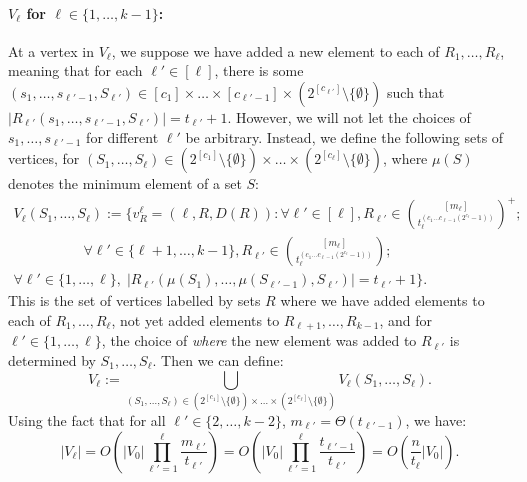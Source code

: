 \documentclass{theoretics}
\renewcommand{\>}{\rangle}
\newcommand{\<}{\langle}
\renewcommand{\(}{\left(}
\renewcommand{\)}{\right)}
\def\abs#1{\left| #1 \right|}
\begin{document}
\paragraph{$V_{\ell}$ for $\ell\in\{1,\dots,k-1\}$:} At a vertex in $V_{\ell}$, we suppose we have added a new element to each of $R_1,\dots,R_{\ell}$, meaning that for each $\ell'\in[\ell]$, there is some $(s_1,\dots,s_{\ell'-1},S_{\ell'})\in [c_1]\times\dots\times [c_{\ell'-1}]\times (2^{[c_{\ell'}]}\setminus\{\emptyset\})$ such that $|R_{\ell'}(s_1,\dots,s_{\ell'-1},S_{\ell'})|=t_{\ell'}+1$. However, we will not let the choices of $s_1,\dots,s_{\ell'-1}$ for different $\ell'$ be arbitrary. Instead, we define the following sets of vertices, for $(S_1,\dots,S_{\ell})\in (2^{[c_1]}\setminus\{\emptyset\})\times\dots\times(2^{[c_\ell]}\setminus\{\emptyset\})$, where $\mu(S)$ denotes the minimum element of a set $S$:
\begin{multline}
\!\!V_{\ell}(S_1,\dots,S_{\ell}) := \Big\{ v^{\ell}_{R}=(\ell,R,D(R)):
\forall \ell'\in [\ell], R_{\ell'}\in\binom{[m_{\ell}]}{t_\ell^{(c_1\dots c_{\ell-1}(2^{c_{\ell}}-1))}}^+\!;\\
\qquad\qquad\quad\forall \ell'\in\{\ell+1,\dots,k-1\}, R_{\ell'}\in\binom{[m_{\ell}]}{t_\ell^{(c_1\dots c_{\ell-1}(2^{c_{\ell}}-1))}};\\
\forall \ell'\in\{1,\dots,\ell\},\; |R_{\ell'}(\mu(S_1),\dots,\mu(S_{\ell'-1}),S_{\ell'})|=t_{\ell'}+1
\Big\}.\label{eq:V-ell-Ss}
\end{multline}
This is the set of vertices labelled by sets $R$ where we have added elements to each of $R_1,\dots,R_{\ell}$, not yet added elements to $R_{\ell+1},\dots,R_{k-1}$, and for $\ell'\in\{1,\dots,\ell\}$, the choice of \emph{where} the new element was added to $R_{\ell'}$ is determined by $S_1,\dots,S_{\ell}$. 
Then we can define:
\begin{equation}
V_{\ell} := \bigcup_{(S_1,\dots,S_{\ell})\in (2^{[c_1]}\setminus\{\emptyset\})\times\dots\times(2^{[c_\ell]}\setminus\{\emptyset\})} V_{\ell}(S_1,\dots,S_{\ell}).\label{eq:V-ell-union}
\end{equation}
Using the fact that for all $\ell'\in\{2,\dots,k-2\}$, $m_{\ell'}=\Theta(t_{\ell'-1})$, we have:
\begin{equation}
\abs{V_{\ell}} = O\left(\abs{V_0} \prod_{\ell'=1}^{\ell}\frac{m_{\ell'}}{t_{\ell'}} \right)=O\left(\abs{V_0} \prod_{\ell'=1}^{\ell}\frac{t_{\ell'-1}}{t_{\ell'}} \right)=O\left(\frac{n}{t_{\ell}}\abs{V_0} \right).\label{eq:kVk0}
\end{equation}
\end{document}
